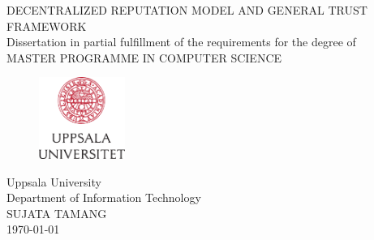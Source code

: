 
\thispagestyle{empty}

\vspace*{+5em}
\begin{center}
DECENTRALIZED REPUTATION MODEL AND GENERAL TRUST FRAMEWORK\\
\vspace*{+8em}
Dissertation in partial fulfillment of the requirements for the degree of\\
\vspace{+2em}
MASTER PROGRAMME IN COMPUTER SCIENCE\\

\vspace*{+3em}
\begin{figure}[H]
\centering
\includegraphics[width=0.25\textwidth]{Images/logo_uu_se.png}
\end{figure}

\vspace*{+3em}
Uppsala University\\
Department of Information Technology\\
\vspace*{+2em}
SUJATA TAMANG\\

\vspace*{+12em}
\today
\end{center}
